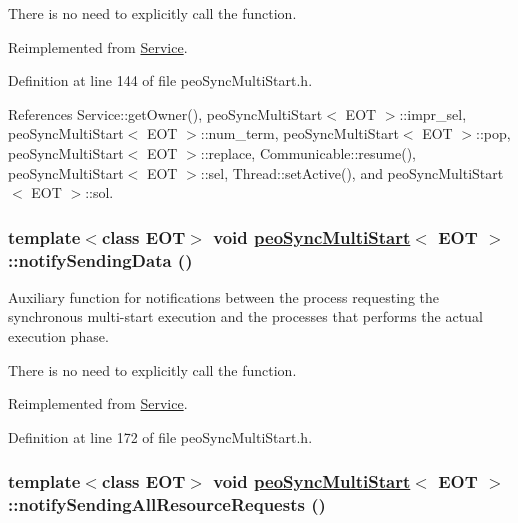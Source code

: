 There is no need to explicitly call the function. 

Reimplemented from \hyperlink{classService_45c06344edbfa482b91f68e2035a6099}{Service}.

Definition at line 144 of file peo\-Sync\-Multi\-Start.h.

References Service::get\-Owner(), peo\-Sync\-Multi\-Start$<$ EOT $>$::impr\_\-sel, peo\-Sync\-Multi\-Start$<$ EOT $>$::num\_\-term, peo\-Sync\-Multi\-Start$<$ EOT $>$::pop, peo\-Sync\-Multi\-Start$<$ EOT $>$::replace, Communicable::resume(), peo\-Sync\-Multi\-Start$<$ EOT $>$::sel, Thread::set\-Active(), and peo\-Sync\-Multi\-Start$<$ EOT $>$::sol.\hypertarget{classpeoSyncMultiStart_32ec0d01d3fd8a9932abd68f4781fc94}{
\subsubsection[notifySendingData]{\setlength{\rightskip}{0pt plus 5cm}template$<$class EOT$>$ void \hyperlink{classpeoSyncMultiStart}{peo\-Sync\-Multi\-Start}$<$ EOT $>$::notify\-Sending\-Data ()}}
\label{classpeoSyncMultiStart_32ec0d01d3fd8a9932abd68f4781fc94}


Auxiliary function for notifications between the process requesting the synchronous multi-start execution and the processes that performs the actual execution phase. 

There is no need to explicitly call the function. 

Reimplemented from \hyperlink{classService_81ad4d6ebb50045b8977e2ab74826f30}{Service}.

Definition at line 172 of file peo\-Sync\-Multi\-Start.h.\hypertarget{classpeoSyncMultiStart_fc90282cc4e93cdea8f82fd52dd78fb0}{
\subsubsection[notifySendingAllResourceRequests]{\setlength{\rightskip}{0pt plus 5cm}template$<$class EOT$>$ void \hyperlink{classpeoSyncMultiStart}{peo\-Sync\-Multi\-Start}$<$ EOT $>$::notify\-Sending\-All\-Resource\-Requests ()}}
\label{classpeoSyncMultiStart_fc90282cc4e93cdea8f82fd52dd78fb0}


